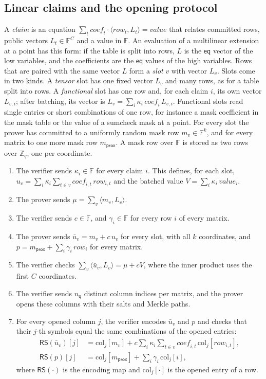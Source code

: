 \documentclass[sigconf,anonymous]{acmart}
\newcommand{\Zq}{\mathbb{Z}_q}
\newcommand{\F}{\mathbb{F}}
\newcommand{\eq}{\mathsf{eq}}
\newcommand{\RS}{\mathsf{RS}}
\newcommand{\ip}[2]{\langle #1, #2\rangle}
\newcommand{\nq}{n_{\mathsf{q}}}
\begin{document}
\subsection{Linear claims and the opening protocol}

A \emph{claim} is an equation $\sum_{t}\mathit{coef}_t\cdot\ip{\mathit{row}_t}{L_t}=\mathit{value}$
that relates committed rows, public vectors $L_t\in\F^{C}$ and a value in $\F$. An evaluation of a
multilinear extension at a point has this form: if the table is split into rows, $L$ is the $\eq$
vector of the low variables, and the coefficients are the $\eq$ values of the high variables. Rows
that are paired with the same vector $L$ form a \emph{slot} $v$ with vector $L_v$. Slots come in two
kinds. A \emph{tensor} slot has one fixed vector $L_v$ and many rows, as for a table split into rows.
A \emph{functional} slot has one row and, for each claim $i$, its own vector $L_{v,i}$; after
batching, its vector is $L_v=\sum_i\kappa_i\,\mathit{coef}_{i}\,L_{v,i}$. Functional slots read
single entries or short combinations of one row, for instance a mask coefficient in the mask table
or the value of a sumcheck mask at a point. For every slot the prover has committed to a uniformly
random mask row $m_v\in\F^{k}$, and for every matrix to one more mask row $m_{\mathsf{prox}}$. A mask
row over $\F$ is stored as two rows over $\Zq$, one per coordinate.

\begin{enumerate}[leftmargin=1.5em,itemsep=1pt,topsep=3pt]
\item The verifier sends $\kappa_i\in\F$ for every claim $i$. This defines, for each slot,
  $u_v=\sum_i\kappa_i\sum_{t\in v}\mathit{coef}_{i,t}\,\mathit{row}_{i,t}$ and the batched value
  $V=\sum_i\kappa_i\,\mathit{value}_i$.
\item The prover sends $\mu=\sum_v\ip{m_v}{L_v}$.
\item The verifier sends $c\in\F$, and $\gamma_i\in\F$ for every row $i$ of every matrix.
\item The prover sends $\bar u_v=m_v+c\,u_v$ for every slot, with all $k$ coordinates, and
  $p=m_{\mathsf{prox}}+\sum_i\gamma_i\,\mathit{row}_i$ for every matrix.
\item The verifier checks $\sum_v\ip{\bar u_v}{L_v}=\mu+cV$, where the inner product uses the first
  $C$ coordinates.
\item The verifier sends $\nq$ distinct column indices per matrix, and the prover opens these
  columns with their salts and Merkle paths.
\item For every opened column $j$, the verifier encodes $\bar u_v$ and $p$ and checks that their
  $j$-th symbols equal the same combinations of the opened entries:
  \begin{align*}
   \RS(\bar u_v)[j]&=\mathrm{col}_j[m_v]+c\sum_i\kappa_i\sum_{t\in v}\mathit{coef}_{i,t}\,\mathrm{col}_j[\mathit{row}_{i,t}],\\
   \RS(p)[j]&=\mathrm{col}_j[m_{\mathsf{prox}}]+\sum_i\gamma_i\,\mathrm{col}_j[i],
  \end{align*}
  where $\RS(\cdot)$ is the encoding map and $\mathrm{col}_j[\cdot]$ is the opened entry of a row.
\end{enumerate}
\end{document}
